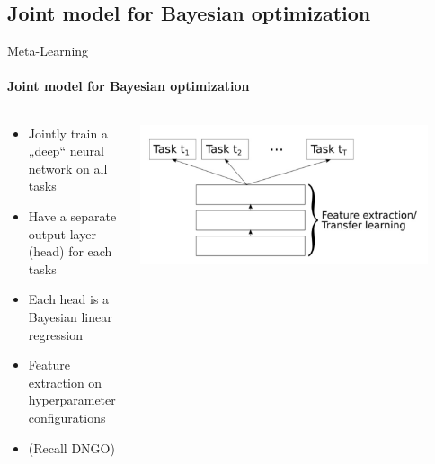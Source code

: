 \subsection{Joint model for Bayesian optimization}
\begin{frame}[c]{Meta-Learning}
\framesubtitle{Joint model for Bayesian optimization}

\begin{columns}[T] %
\begin{column}{.38\textwidth}

\begin{itemize}
    \item<1-5> Jointly train a „deep“ neural network on all tasks 
    \item<2-5> Have a separate output layer (head) for each tasks 
    \item<3-5> Each head is a Bayesian linear regression 
    \item<4-5> Feature extraction on hyperparameter configurations 
    \item<5-5> (Recall DNGO)
\end{itemize}
\end{column}%

\hfill%

\begin{column}{.58\textwidth}
\includegraphics[width=0.9\textwidth]{images/meta_learning/perrone_int.jpg}
\end{column}%
\end{columns}


\end{frame}

